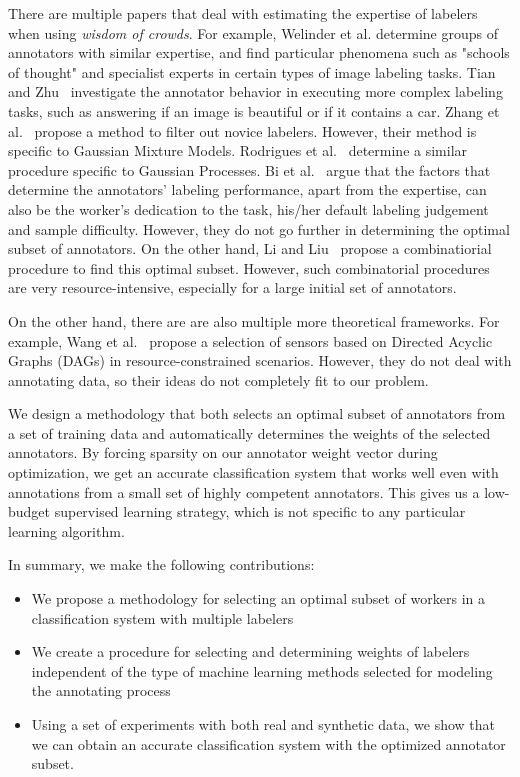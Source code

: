 \documentclass{llncs}
\begin{document}
There are multiple papers that deal with estimating the expertise of labelers when using \textit{wisdom of crowds}. For example, Welinder et al. \cite{welinder2010multidimensional} determine groups of annotators with similar expertise, and find particular phenomena such as "schools of thought" and specialist experts in certain types of image labeling tasks. Tian and Zhu~\cite{tian2012learning} investigate the annotator behavior in executing more complex labeling tasks, such as answering if an image is beautiful or if it contains a car. Zhang et al.~\cite{zhang2013learning} propose a method to filter out novice labelers. However, their method is specific to Gaussian Mixture Models. Rodrigues et al.~\cite{rodrigues2014gaussian} determine a similar procedure specific to Gaussian Processes. Bi et al.~\cite{bi2014learning} argue that the factors that determine the annotators' labeling performance, apart from the expertise, can also be the worker's dedication to the task, his/her default labeling judgement and sample difficulty. However, they do not go further in determining the optimal subset of annotators. On the other hand, Li and Liu~\cite{li_liu_2015} propose a combinatiorial procedure to find this optimal subset. However, such combinatorial procedures are very resource-intensive, especially for a large initial set of annotators.

On the other hand, there are are also multiple more theoretical frameworks. For example, Wang et al.~\cite{wang2015efficient} propose a selection of sensors based on Directed Acyclic Graphs (DAGs) in resource-constrained scenarios. However, they do not deal with annotating data, so their ideas do not completely fit to our problem. 

We design a methodology that both selects an optimal subset of annotators from a set of training data and automatically determines the weights of the selected annotators. By forcing sparsity on our annotator weight vector during optimization, we get an accurate classification system that works well even with annotations from a small set of highly competent annotators. This gives us a low-budget supervised learning strategy, which is not specific to any particular learning algorithm.

In summary, we make the following contributions:
\begin{itemize}
\item We propose a methodology for selecting an optimal subset of workers in a classification system with multiple labelers
\item We create a procedure for selecting and determining weights of labelers independent of the type of machine learning methods selected for modeling the annotating process
\item Using a set of experiments with both real and synthetic data, we show that we can obtain an accurate classification system with the optimized annotator subset.
\end{itemize}  
\end{document}
